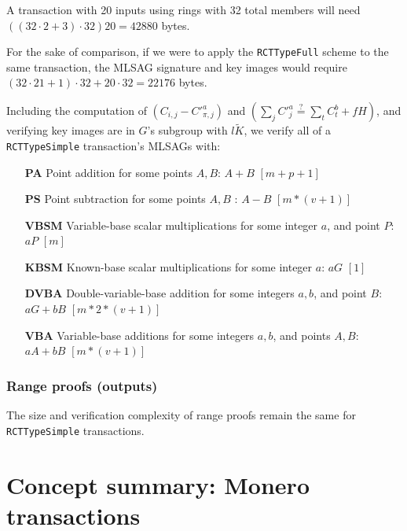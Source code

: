 A transaction with 20 inputs using rings with 32 total members will need \(((32 \cdot 2 + 3) \cdot 32) 20 = 42880 \) bytes.

For the sake of comparison, if we were to apply the {\tt RCTTypeFull} scheme to the same transaction, the MLSAG signature and key images would require \(( 32 \cdot 21 + 1) \cdot 32 + 20 \cdot 32 = 22176\) bytes.

Including the computation of \( (C_{i, j} - C'^a_{\pi, j}) \) and \( (\sum_j C'^a_{j} \stackrel{?}{=} \sum_t C^b_{t} + f H)\), and verifying key images are in $G$'s subgroup with $l \tilde{K}$, we verify all of a {\tt RCTTypeSimple} transaction's MLSAGs with:

\begin{itemize}
    \setlength\itemsep{\listspace}
    \item [\textbf{PA}] Point addition for some points $A, B$: $A + B$ \quad \([m + p + 1]\)%
    \item [\textbf{PS}] Point subtraction for some points $A, B$ : $A - B$ \quad \([m*(v+1)]\) %
    \item [\textbf{VBSM}] Variable-base scalar multiplications for some integer $a$, and point $P$: $a P$ \quad \([m]\)
    \item [\textbf{KBSM}] Known-base scalar multiplications for some integer $a$: $a G$ \quad \([1]\)
    \item [\textbf{DVBA}] Double-variable-base addition for some integers $a, b$, and point $B$: $a G + b B$ \quad \([m*2*(v+1)]\)
    \item [\textbf{VBA}] Variable-base additions for some integers $a, b$, and points $A, B$: $a A + b B$ \quad \([m*(v+1)]\)
\end{itemize}

\subsubsection*{Range proofs (outputs)}

The size and verification complexity of range proofs remain the same for {\tt RCTTypeSimple} transactions.


\newpage
\section{Concept summary: Monero transactions}
\label{sec:transaction_summary}

